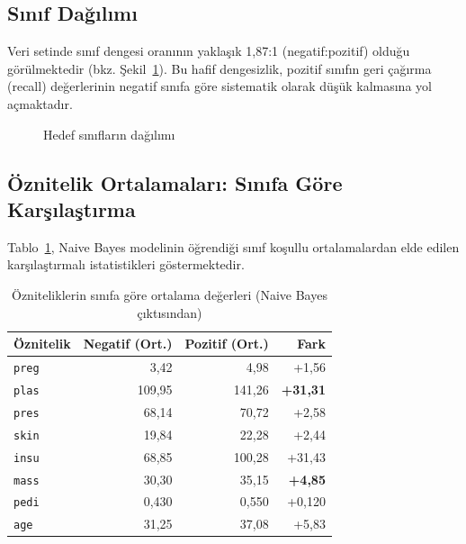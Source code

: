 \documentclass[12pt,a4paper]{article}
\begin{document}
\subsection{Sınıf Dağılımı}

Veri setinde sınıf dengesi oranının yaklaşık 1{,}87:1 (negatif:pozitif)
olduğu görülmektedir (bkz. Şekil~\ref{fig:classdist}). Bu hafif dengesizlik,
pozitif sınıfın geri çağırma (recall) değerlerinin negatif sınıfa göre
sistematik olarak düşük kalmasına yol açmaktadır.

\begin{figure}[H]
\centering
{}
\caption{Hedef sınıfların dağılımı}
\label{fig:classdist}
\end{figure}

\subsection{Öznitelik Ortalamaları: Sınıfa Göre Karşılaştırma}

Tablo~\ref{tab:means}, Naive Bayes modelinin öğrendiği sınıf koşullu
ortalamalardan elde edilen karşılaştırmalı istatistikleri göstermektedir.

\begin{table}[H]
\centering
\caption{Özniteliklerin sınıfa göre ortalama değerleri (Naive Bayes çıktısından)}
\label{tab:means}
\begin{tabular}{@{}lrrr@{}}
\toprule
\textbf{Öznitelik} &
\textbf{Negatif (Ort.)} &
\textbf{Pozitif (Ort.)} &
\textbf{Fark} \\
\midrule
\texttt{preg}  & 3{,}42   & 4{,}98   & +1{,}56 \\
\texttt{plas}  & 109{,}95 & 141{,}26 & \textbf{+31{,}31} \\
\texttt{pres}  & 68{,}14  & 70{,}72  & +2{,}58 \\
\texttt{skin}  & 19{,}84  & 22{,}28  & +2{,}44 \\
\texttt{insu}  & 68{,}85  & 100{,}28 & +31{,}43 \\
\texttt{mass}  & 30{,}30  & 35{,}15  & \textbf{+4{,}85} \\
\texttt{pedi}  & 0{,}430  & 0{,}550  & +0{,}120 \\
\texttt{age}   & 31{,}25  & 37{,}08  & +5{,}83 \\
\bottomrule
\end{tabular}
\end{table}
\end{document}
